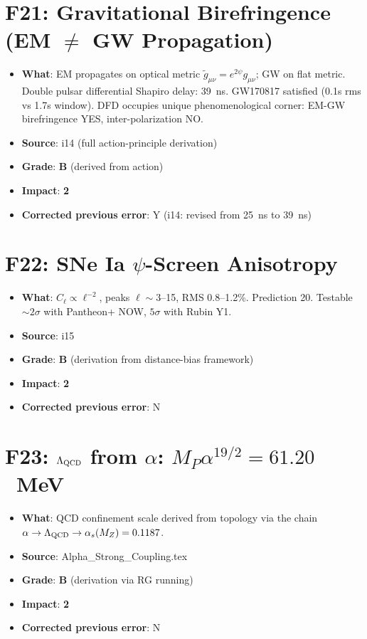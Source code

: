 \documentclass[11pt,a4paper]{article}
\newcommand{\grade}[1]{\textbf{#1}}
\newcommand{\impact}[1]{\textbf{#1}}
\begin{document}
\section{F21: Gravitational Birefringence (EM $\neq$ GW Propagation)}
\begin{itemize}[nosep]
\item \textbf{What}: EM propagates on optical metric $\tilde{g}_{\mu\nu} = e^{2\psi}g_{\mu\nu}$; GW on flat metric. Double pulsar differential Shapiro delay: 39~ns. GW170817 satisfied (0.1s rms vs 1.7s window). DFD occupies unique phenomenological corner: EM-GW birefringence YES, inter-polarization NO.
\item \textbf{Source}: i14 (full action-principle derivation)
\item \textbf{Grade}: \grade{B} (derived from action)
\item \textbf{Impact}: \impact{2}
\item \textbf{Corrected previous error}: Y (i14: revised from 25~ns to 39~ns)
\end{itemize}

\section{F22: SNe Ia $\psi$-Screen Anisotropy}
\begin{itemize}[nosep]
\item \textbf{What}: $C_\ell \propto \ell^{-2}$, peaks $\ell \sim 3$--15, RMS 0.8--1.2\%. Prediction 20. Testable $\sim 2\sigma$ with Pantheon+ NOW, $5\sigma$ with Rubin Y1.
\item \textbf{Source}: i15
\item \textbf{Grade}: \grade{B} (derivation from distance-bias framework)
\item \textbf{Impact}: \impact{2}
\item \textbf{Corrected previous error}: N
\end{itemize}

\section{F23: $\Lambda_{\rm QCD}$ from $\alpha$: $M_P \alpha^{19/2} = 61.20$~MeV}
\begin{itemize}[nosep]
\item \textbf{What}: QCD confinement scale derived from topology via the chain $\alpha \to \Lambda_{\rm QCD} \to \alpha_s(M_Z) = 0.1187$.
\item \textbf{Source}: Alpha\_Strong\_Coupling.tex
\item \textbf{Grade}: \grade{B} (derivation via RG running)
\item \textbf{Impact}: \impact{2}
\item \textbf{Corrected previous error}: N
\end{itemize}
\end{document}
